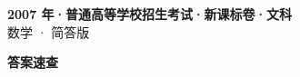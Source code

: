 \documentclass[zihao=-4, a4paper]{ctexart}
\begin{document}
\begin{center}
  {\Large\bfseries 2007 年·普通高等学校招生考试·新课标卷·文科}\\[4pt]
  {\large 数学 · 简答版}
\end{center}
\medskip
{}

\clearpage
{}
\begin{center}{\Large\bfseries 答案速查}\end{center}
\medskip

\end{document}
